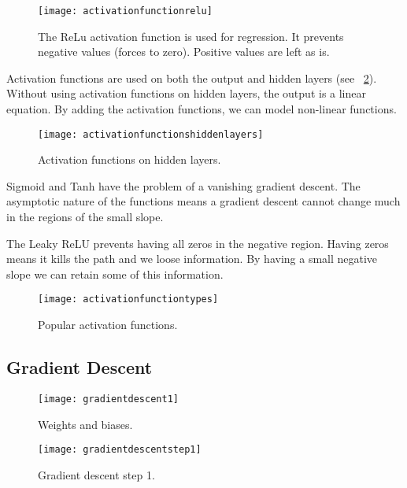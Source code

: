  	\begin{figure}[h]
		\centering
		\texttt{[image: activationfunctionrelu]}
		\caption[The ReLu activation function]{The ReLu activation function is used for regression.  It prevents negative values (forces to zero).  Positive values are left as is.}
		\label{fig:activationfunctionrelu}
	\end{figure}

Activation functions are used on both the output and hidden layers (see \figurename~\ref{fig:activationfunctionshiddenlayers}).  Without using activation functions on hidden layers, the output is a linear equation.  By adding the activation functions, we can model non-linear functions.

 	\begin{figure}[h]
		\centering
		\texttt{[image: activationfunctionshiddenlayers]}
		\caption[Activation functions on hidden layers]{Activation functions on hidden layers.}
		\label{fig:activationfunctionshiddenlayers}
	\end{figure}

Sigmoid and Tanh have the problem of a vanishing gradient descent.  The asymptotic nature of the functions means a gradient descent cannot change much in the regions of the small slope.

The Leaky ReLU prevents having all zeros in the negative region.  Having zeros means it kills the path and we loose information.  By having a small negative slope we can retain some of this information.

 	\begin{figure}[h]
		\centering
		\texttt{[image: activationfunctiontypes]}
		\caption[Popular activation functions]{Popular activation functions.}
		\label{fig:activationfunctiontypes}
	\end{figure}

	\subsection{Gradient Descent}

 	\begin{figure}[h]
		\centering
		\texttt{[image: gradientdescent1]}
		\caption[Weights and biases]{Weights and biases.}
		\label{fig:gradientdescent1}
	\end{figure}


 	\begin{figure}[h]
		\centering
		\texttt{[image: gradientdescentstep1]}
		\caption[Gradient descent step 1]{Gradient descent step 1.}
		\label{fig:gradientdescentstep1}
	\end{figure}

